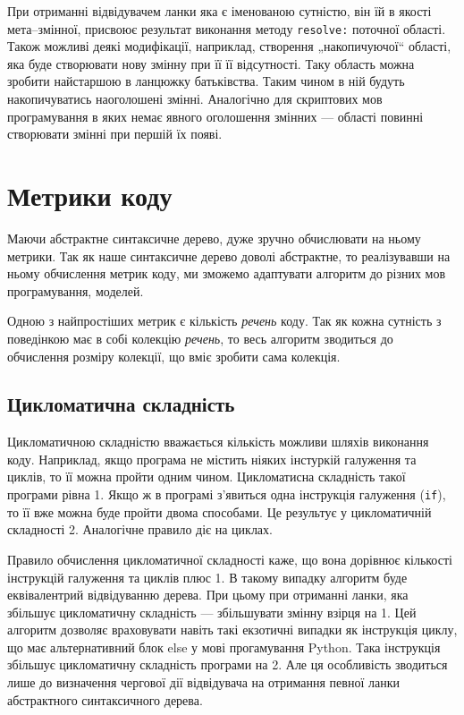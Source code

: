 \documentclass[12pt,a4paper]{article}
\begin{document}
При отриманні відвідувачем ланки яка є іменованою сутністю, він їй в якості мета--змінної, присвоює результат виконання методу \lstinline$resolve:$ поточної області. Також можливі деякі модифікації, наприклад, створення „накопичуючої“ області, яка буде створювати нову змінну при її її відсутності. Таку область можна зробити найстаршою в ланцюжку батьківства. Таким чином в ній будуть накопичуватись наоголошені змінні. Аналогічно для скриптових мов програмування в яких немає явного оголошення змінних --- області повинні створювати змінні при першій їх появі.
\clearpage

\section{Метрики коду}
Маючи абстрактне синтаксичне дерево, дуже зручно обчислювати на ньому метрики. Так як наше синтаксичне дерево доволі абстрактне, то реалізувавши на ньому обчислення метрик коду, ми зможемо адаптувати алгоритм до різних мов програмування, моделей. 

Одною з найпростіших метрик є кількість \emph{речень} коду. Так як кожна сутність з поведінкою має в собі колекцію \emph{речень}, то весь алгоритм зводиться до обчислення розміру колекції, що вміє зробити сама колекція.

\subsection{Цикломатична складність}
Цикломатичною складністю вважається кількість можливи шляхів виконання коду. Наприклад, якщо програма не містить ніяких інстуркій галуження та циклів, то її можна пройти одним чином. Цикломатисна складність такої програми рівна 1. Якщо ж в програмі з'явиться одна інструкція галуження (\lstinline$if$), то її вже можна буде пройти двома способами. Це результує у цикломатичній складності 2. Аналогічне правило діє на циклах. 

Правило обчислення цикломатичної складності каже, що вона дорівнює кількості інструкцій галуження та циклів плюс 1. В такому випадку алгоритм буде еквівалентрий відвідуванню дерева. При цьому при отриманні ланки, яка збільшує цикломатичну складність --- збільшувати змінну взірця на 1. Цей алгоритм дозволяє враховувати навіть такі екзотичні випадки як інструкція циклу, що має альтернативний блок else у мові прогамування Python. Така інструкція збільшує цикломатичну складність програми на 2. Але ця особливість зводиться лише до визначення чергової дії відвідувача на отримання певної ланки абстрактного синтаксичного дерева.
\end{document}
